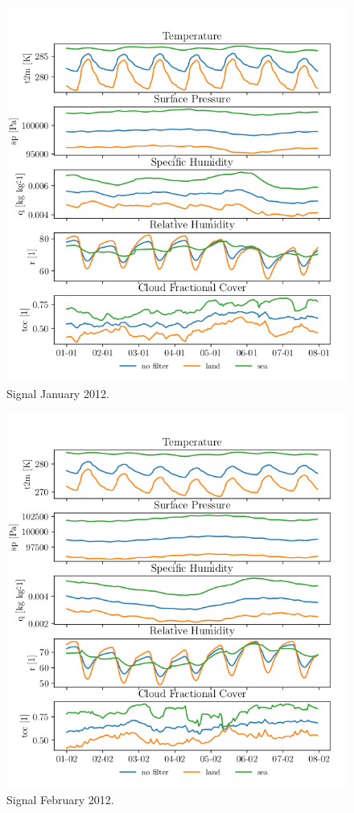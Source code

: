 \begin{figure}[ht]
    \centering
    \includegraphics{python_figs/spatially_averaged_one_week_from_2012-01-01.png}
    \caption{Signal January 2012.}
    \label{fig:jan12}
\end{figure}

\begin{figure}[ht]
    \centering
    \includegraphics{python_figs/spatially_averaged_one_week_from_2012-02-01.png}
    \caption{Signal February 2012.}
    \label{fig:feb12}
\end{figure}

